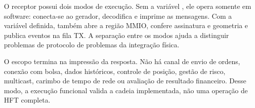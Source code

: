 O receptor possui dois modos de execução. Sem a variável , ele opera somente em software: conecta-se ao gerador, decodifica e imprime as mensagens. Com a variável definida, também abre a região MMIO, confere assinatura e geometria e publica eventos na fila TX. A separação entre os modos ajuda a distinguir problemas de protocolo de problemas da integração física.

O escopo termina na impressão da resposta. Não há canal de envio de ordens, conexão com bolsa, dados históricos, controle de posição, gestão de risco, multicast, carimbo de tempo de rede ou avaliação de resultado financeiro. Desse modo, a execução funcional valida a cadeia implementada, não uma operação de HFT completa.
